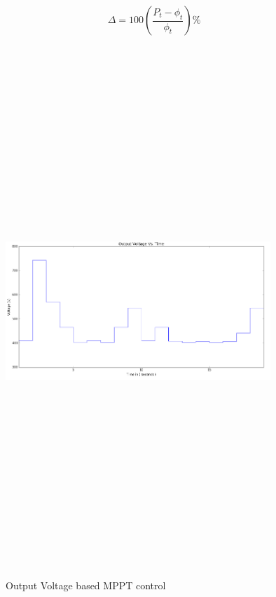 \begin{equation}
\Delta  = 100 ( \frac{P_t - \phi_t}{\phi_t})\%
\end{equation}

\begin{center}
\begin{figure}
\includegraphics[width=10cm,height=20cm,keepaspectratio]{9.png}
\caption {Output Voltage based MPPT control}
\label{Fig:9}    
\end{figure}
\end{center}

